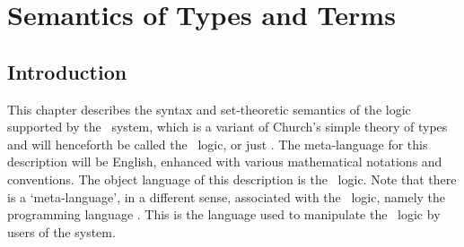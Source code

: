 
\chapter{Semantics of Types and Terms}\label{semantics}

\section{Introduction}
\label{introduction}

This chapter describes the syntax and set-theoretic semantics of the
logic supported by the \HOL\ system, which is a variant of
Church's simple theory of types \cite{church:stt} and
will henceforth be called the \HOL\ logic, or just \HOL.  The
meta-language for this description will be English, enhanced with
various mathematical notations and conventions.  The object language
of this description is the \HOL\ logic.  Note that there is a
`meta-language', in a different sense, associated with the \HOL\
logic, namely the programming language \ML.  This is the language used
to manipulate the \HOL\ logic by users of the system.

